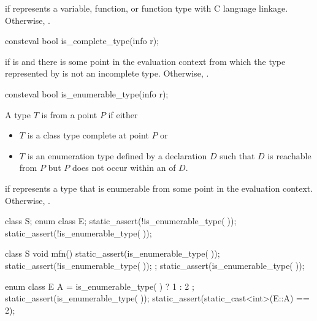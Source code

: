 \begin{itemdescr}
\pnum
\returns
{} if  represents a
variable,
function, or
function type
with C language linkage.
Otherwise, .
\end{itemdescr}

%
\begin{itemdecl}
consteval bool is_complete_type(info r);
\end{itemdecl}

\begin{itemdescr}
\pnum
\returns
{} if  is 
and there is some point in the evaluation context
from which the type represented by 
is not an incomplete type.
Otherwise, .
\end{itemdescr}

%
\begin{itemdecl}
consteval bool is_enumerable_type(info r);
\end{itemdecl}

\begin{itemdescr}
\pnum
A type $T$ is  from a point $P$ if either
\begin{itemize}
\item
  $T$ is a class type complete at point $P$ or
\item
  $T$ is an enumeration type defined by a declaration $D$
  such that $D$ is reachable from $P$
  but $P$ does not occur within an  of $D$.
\end{itemize}

\pnum
\returns
{} if  represents a type that is enumerable
from some point in the evaluation context.
Otherwise, .

\pnum
\begin{example}
\begin{codeblock}
class S;
enum class E;
static_assert(!is_enumerable_type(^^S));
static_assert(!is_enumerable_type(^^E));

class S {
  void mfn() {
    static_assert(is_enumerable_type(^^S));
  }
  static_assert(!is_enumerable_type(^^S));
};
static_assert(is_enumerable_type(^^S));

enum class E {
  A = is_enumerable_type(^^E) ? 1 : 2
};
static_assert(is_enumerable_type(^^E));
static_assert(static_cast<int>(E::A) == 2);
\end{codeblock}
\end{example}
\end{itemdescr}

